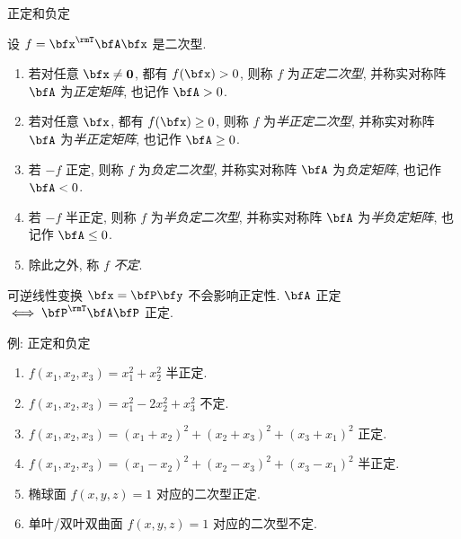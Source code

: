 \begin{frame}{正定和负定}
	\onslide<+->
	\begin{definition}
		设 $f=\bfx^\rmT\bfA\bfx$ 是二次型.
		\begin{enumerate}
			\item 若对任意 $\bfx\neq{\bf0}$, 都有 $f(\bfx)>0$, 则称 $f$ 为\emph{正定二次型}, 并称实对称阵 $\bfA$ 为\emph{正定矩阵}, 也记作 $\bfA>0$.
			\item 若对任意 $\bfx$, 都有 $f(\bfx)\ge0$, 则称 $f$ 为\emph{半正定二次型}, 并称实对称阵 $\bfA$ 为\emph{半正定矩阵}, 也记作 $\bfA\ge0$.
			\item 若 $-f$ 正定, 则称 $f$ 为\emph{负定二次型}, 并称实对称阵 $\bfA$ 为\emph{负定矩阵}, 也记作 $\bfA<0$.
			\item 若 $-f$ 半正定, 则称 $f$ 为\emph{半负定二次型}, 并称实对称阵 $\bfA$ 为\emph{半负定矩阵}, 也记作 $\bfA\le0$.
			\item 除此之外, 称 $f$ \emph{不定}.
		\end{enumerate}
	\end{definition}
	\onslide<+->
	可逆线性变换 $\bfx=\bfP\bfy$ 不会影响正定性.
	\onslide<+->
	$\bfA$ 正定$\iff \bfP^\rmT\bfA\bfP$ 正定.
\end{frame}


\begin{frame}{例: 正定和负定}
	\onslide<+->
	\begin{example}
		\begin{enumerate}
			\item $f(x_1,x_2,x_3)=x_1^2+x_2^2$ 半正定.
			\item $f(x_1,x_2,x_3)=x_1^2-2x_2^2+x_3^2$ 不定.
			\item $f(x_1,x_2,x_3)=(x_1+x_2)^2+(x_2+x_3)^2+(x_3+x_1)^2$ 正定.
			\item $f(x_1,x_2,x_3)=(x_1-x_2)^2+(x_2-x_3)^2+(x_3-x_1)^2$ 半正定.
			\item 椭球面 $f(x,y,z)=1$ 对应的二次型正定.
			\item 单叶/双叶双曲面 $f(x,y,z)=1$ 对应的二次型不定.
		\end{enumerate}
	\end{example}
\end{frame}


